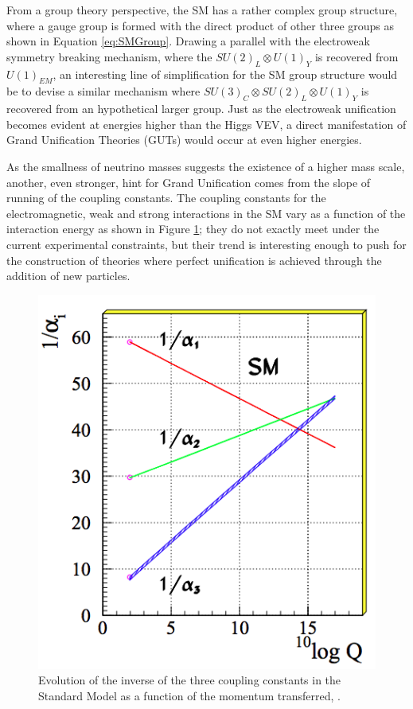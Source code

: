 From a group theory perspective, the SM has a rather complex group structure, where a gauge group is formed with the direct product of other three groups as shown in Equation \ref{eq:SMGroup}. Drawing a parallel with the electroweak symmetry breaking mechanism, where the $ SU(2)_L \otimes U(1)_Y$ is recovered from $U(1)_{EM}$, an interesting line of simplification for the SM group structure would be to devise a similar mechanism where $SU(3)_C  \otimes SU(2)_L \otimes U(1)_Y$ is recovered from an hypothetical larger group.  Just as the electroweak unification becomes evident at energies higher than the Higgs VEV,  a direct manifestation of Grand Unification Theories (GUTs) would occur at even higher energies.

As the smallness of neutrino masses suggests the existence of a higher mass scale, another, even stronger, hint for Grand Unification comes from the slope of running of the coupling constants. The coupling constants for the electromagnetic, weak and strong interactions in the SM vary as a function of the interaction energy as shown in Figure \ref{fig:constants};  they do not exactly meet under the current experimental constraints, but their trend is interesting enough to push for the construction of theories where perfect unification is achieved through the addition of new particles. 


\begin{figure}[hbpt]
\centering
\includegraphics[scale=0.5]{Chapter-1/Images/RunninConstant.png}
\caption{Evolution of the inverse of the three coupling constants in the Standard Model as a function of the momentum transferred, \cite{Kazakov:2000ra}.}
\label{fig:constants}
\end{figure}



